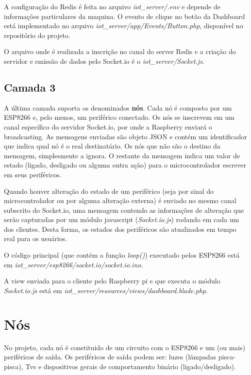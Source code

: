 \documentclass[
12pt,				%
openany,			%
twoside,			%
a4paper,			%
english,			%
french,				%
spanish,			%
brazil,				%
]{abntex2}
\begin{document}
A configuração do Redis é feita no arquivo \textit{iot\_server/.env} e depende de informações particulares da maquina. O evento de clique no botão da Dashboard está implementado no arquivo \textit{iot\_server/app/Events/Button.php}, disponível no repositório do projeto.

O arquivo onde é realizada a inscrição no canal do server Redis e a criação do servidor e emissão de dados pelo Socket.io é o \textit{iot\_server/Socket.js}. 



\section{Camada 3}
A última camada suporta os denominados \textbf{nós}. Cada nó é composto por um ESP8266 e, pelo menos, um periférico conectado. Os nós se inscrevem em um canal específico do servidor Socket.io, por onde a Raspberry enviará o broadcasting. As mensagens enviadas são objeto JSON e contém um identificador que indica qual nó é o real destinatário. Os nós que não são o destino da mensagem, simplesmente a ignora.
O restante da mensagem indica um valor de estado (ligado, desligado ou alguma outra ação) para o microcontrolador escrever em seus periféricos.

Quando houver alteração do estado de um periférico (seja por sinal do microcontrolador ou por alguma alteração externa) é enviado no mesmo canal subscrito do Socket.io, uma mensagem contendo as informações de alteração que serão capturadas por um módulo javascript (\textit{Socket.io.js}) rodando em cada um dos clientes. Desta forma, os estados dos periféricos são atualizados em tempo real para os usuários.

O código principal (que contém a função \textit{loop()}) executado pelos ESP8266 está em \textit{iot\_server/esp8266/socket.io/socket.io.ino}.

A view enviada para o cliente pelo Raspberry pi e que executa o módulo \textit{Socket.io.js} está em \textit{iot\_server/resources/views/dashboard.blade.php}.

\chapter{Nós}
No projeto, cada nó é constituido de um circuito com o ESP8266 e um (ou mais) periféricos de saída. Os periféricos de saída podem ser: luzes (lámpadas pisca-pisca), Tvs e dispositivos gerais de comportamento binário (ligado/desligado).
\end{document}
